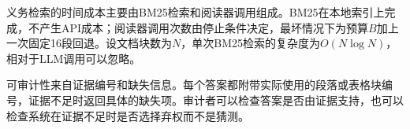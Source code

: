 义务检索的时间成本主要由BM25检索和阅读器调用组成。BM25在本地索引上完成，不产生API成本；阅读器调用次数由停止条件决定，最坏情况下为预算$B$加上一次固定16段回退。设文档块数为$N$，单次BM25检索的复杂度为$O(N\log N)$，相对于LLM调用可以忽略。

可审计性来自证据编号和缺失信息。每个答案都附带实际使用的段落或表格块编号，证据不足时返回具体的缺失项。审计者可以检查答案是否由证据支持，也可以检查系统在证据不足时是否选择弃权而不是猜测。


